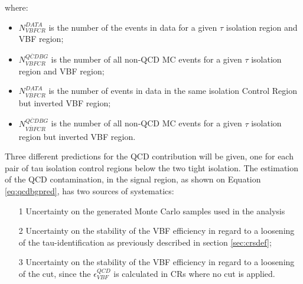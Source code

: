 where:

\begin{itemize}
	\item $N^{DATA}_{VBF CR}$ is the number of the events in data for a given $ \tau $ isolation region and VBF region;
	\item $N^{\overline{QCD} BG}_{VBFCR}$ is the number of all non-QCD MC events for a given $ \tau $ isolation region and VBF region;
	\item $N^{DATA}_{\overline{VBF}CR}$ is the number of events in data in the same isolation Control Region but inverted VBF region;
	\item $N^{\overline{QCD} BG}_{\overline{VBF}CR}$ is the number of all non-QCD MC events for a given $ \tau $ isolation region but inverted VBF region.
\end{itemize}

Three different predictions for the QCD contribution will be given, one for each pair of tau isolation control regions below the two tight isolation. The estimation of the QCD contamination, in the signal region,  as shown on Equation \ref{eq:qcdbgpred}, has two sources of systematics:  

\begin{itemize}
	\item[1]Uncertainty on the generated Monte Carlo samples used in the analysis
	\item[2]  Uncertainty on the stability of the VBF efficiency in regard to a loosening of the tau-identification as previously described in section \ref{sec:crsdef};
	\item[3] Uncertainty on the stability of the VBF efficiency in regard to a loosening of the \met cut, since the $\epsilon^{QCD}_{VBF}$ is calculated in CRs where no \met cut is applied.
\end{itemize}

